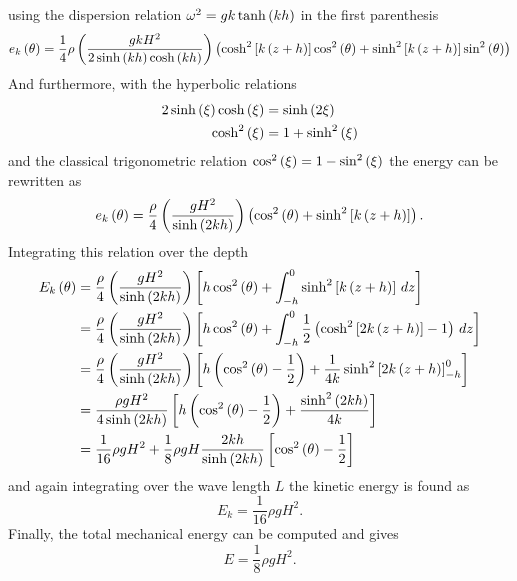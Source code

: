 using the dispersion relation $\omega^{2}=gk\tanh\left( kh \right)$ in the first parenthesis
\begin{equation*}
e_{k}\left( \theta \right)=\dfrac{1}{4}\rho\left( \dfrac{gkH^{2}}{2\sinh\left( kh \right)\cosh\left( kh \right)} \right)\left( \cosh^{2}\left[ k\left( z+h \right) \right]\cos^{2}\left( \theta \right)+
\sinh^{2}\left[ k\left( z+h \right) \right]\sin^{2}\left( \theta \right) \right)
\end{equation*}
And furthermore, with the hyperbolic relations 
\begin{align*}
2\sinh\left( \xi \right)\cosh\left( \xi \right)&=\sinh\left( 2\xi \right)\\
\cosh^{2}\left( \xi \right)&=1+\sinh^{2}\left( \xi \right)
\end{align*}
and the classical trigonometric relation $\cos^{2}\left( \xi \right)=1-\sin^{2}\left( \xi \right)$ the energy can be rewritten as
\begin{equation}
e_{k}\left( \theta \right)=\dfrac{\rho}{4}\left( \dfrac{gH^{2}}{\sinh\left( 2kh \right)} \right)\left( \cos^{2}\left( \theta \right)+\sinh^{2}\left[ k\left( z+h \right) \right] \right).
\end{equation}
Integrating this relation over the depth
\begin{align*}
E_{k}\left( \theta \right)&=\dfrac{\rho}{4}\left( \dfrac{gH^{2}}{\sinh\left( 2kh \right)} \right)\left[ h\cos^{2}\left( \theta \right)+\int_{-h}^{0}\sinh^{2}\left[ k\left( z+h \right) \right]\,dz \right]\\
&=\dfrac{\rho}{4}\left( \dfrac{gH^{2}}{\sinh\left( 2kh \right)} \right)\left[ h\cos^{2}\left( \theta \right)+\int_{-h}^{0}\dfrac{1}{2}\left( \cosh^{2}\left[ 2k\left( z+h \right) \right]-1 \right)\,dz \right]\\
&=\dfrac{\rho}{4}\left( \dfrac{gH^{2}}{\sinh\left( 2kh \right)} \right)\left[ h\left( \cos^{2}\left( \theta \right)-\dfrac{1}{2} \right)+\dfrac{1}{4k}\sinh^{2}\left[ 2k\left( z+h \right) \right]_{-h}^{0} \right]\\
&=\dfrac{\rho gH^{2}}{4\sinh\left( 2kh \right)}\left[ h\left( \cos^{2}\left( \theta \right)-\dfrac{1}{2} \right)+\dfrac{\sinh^{2}\left( 2kh \right)}{4k} \right]\\
&=\dfrac{1}{16}\rho gH^{2} + \dfrac{1}{8}\rho gH \dfrac{2kh}{\sinh\left( 2kh \right)}\left[ \cos^{2}\left( \theta \right)-\dfrac{1}{2} \right]
\end{align*}
and again integrating over the wave length $L$ the kinetic energy is found as
\begin{equation}
E_{k}=\dfrac{1}{16}\rho g H^{2}.
\end{equation}
Finally, the total mechanical energy can be computed and gives
\begin{equation}
E=\dfrac{1}{8}\rho g H^{2}.
\end{equation}
